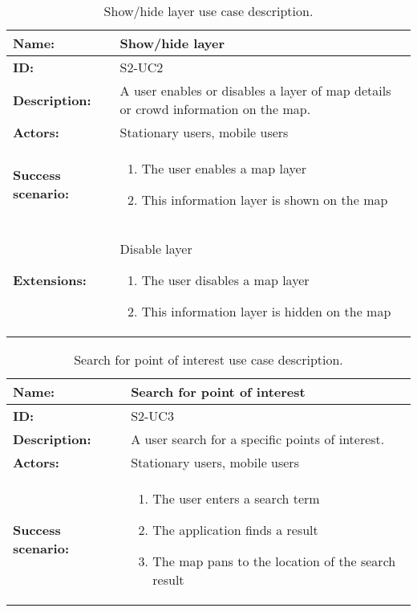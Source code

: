 \begin{table}[htbp]
    \centering
    \begin{tabularx}{\textwidth}{lX}
        \toprule
        \textbf{Name:}  & Show/hide layer \\ \midrule
        \textbf{ID:}    & S2-UC2 \\ \midrule
        \textbf{Description:} & A user enables or disables a layer of map details or crowd information on the map. \\ \midrule
        \textbf{Actors:} & Stationary users, mobile users \\ \midrule
        \textbf{Success scenario:} & 
        \begin{enumerate}
            \item The user enables a map layer
            \item This information layer is shown on the map
        \end{enumerate}
        \\ \midrule
        \textbf{Extensions:} & Disable layer 
        \begin{enumerate}
            \item The user disables a map layer
            \item This information layer is hidden on the map
        \end{enumerate}
        \\ \bottomrule
    \end{tabularx}
    \caption{Show/hide layer use case description.}
    \label{tab:s2-uc2}
\end{table}

\begin{table}[htbp]
    \centering
    \begin{tabularx}{\textwidth}{lX}
        \toprule
        \textbf{Name:}  & Search for point of interest \\ \midrule
        \textbf{ID:}    & S2-UC3 \\ \midrule
        \textbf{Description:} & A user search for a specific points of interest. \\ \midrule
        \textbf{Actors:} & Stationary users, mobile users \\ \midrule
        \textbf{Success scenario:} & 
        \begin{enumerate}
            \item The user enters a search term
            \item The application finds a result
            \item The map pans to the location of the search result
        \end{enumerate}
        \\ \bottomrule
    \end{tabularx}
    \caption{Search for point of interest use case description.}
    \label{tab:s2-uc3}
\end{table}

